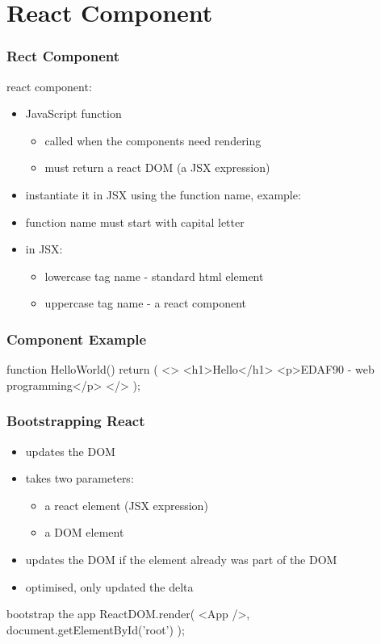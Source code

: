 \section{React Component}
\begin{frame}[fragile] \frametitle{Rect Component}
react component:
\begin{itemize}
  \item JavaScript function
  \begin{itemize}
    \item called when the components need rendering
    \item must return a react DOM (a JSX expression)
  \end{itemize}
  \item instantiate it in JSX using the function name, example: 
  \item function name must start with capital letter
  \item in JSX:
  \begin{itemize}
    \item lowercase tag name - standard html element
    \item uppercase tag name - a react component
  \end{itemize}
\end{itemize}
\end{frame}

\begin{frame}[fragile] \frametitle{Component Example}
\begin{CodeBox}{}
  function HelloWorld(){
    return (
      <>
        <h1>Hello</h1>
        <p>EDAF90 - web programming</p>
      </>
    );
  }
\end{CodeBox}
\end{frame}

\begin{frame}[fragile] \frametitle{Bootstrapping React}
\begin{itemize}
  \item updates the DOM
  \item takes two parameters:
  \begin{itemize}
    \item a react element (JSX expression)
    \item a DOM element
  \end{itemize}
  \item updates the DOM if the element already was part of the DOM
  \item optimised, only updated the delta
\end{itemize}
\begin{CodeBox}{bootstrap the app}
ReactDOM.render(
   <App />,
  document.getElementById('root')
);
\end{CodeBox}
\end{frame}

